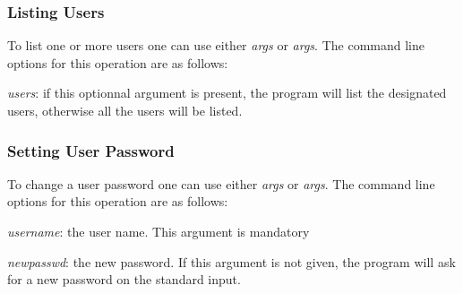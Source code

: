 \subsubsection{Listing Users}
To list one or more users one can use either  \emph{args}
or  \emph{args}.
The command line options for this operation are as follows:
\bi
\item \emph{users}: if this optionnal argument is present, the program
will list the designated users, otherwise all the users will be listed.
\ei
\subsubsection{Setting User Password}
To change a user password one can use either  \emph{args}
or  \emph{args}.
The command line options for this operation are as follows:
\bi
\item \emph{username}: the user name. This argument is mandatory
\item \emph{newpasswd}: the new password. If this argument is not given,
the program will ask for a new password on the standard input.
\ei
